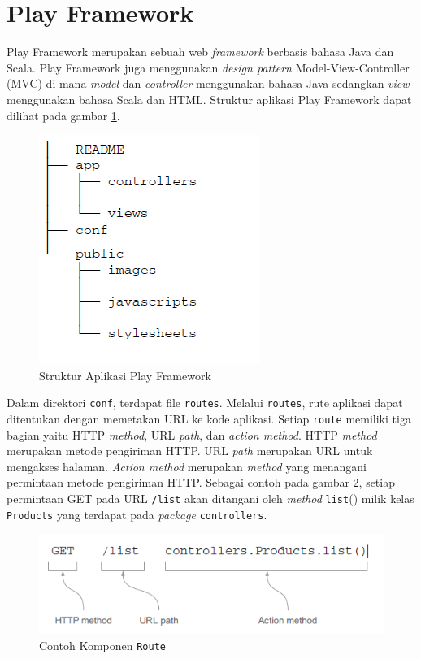 \section{Play Framework}
\label{sec:play}

Play Framework\cite{Leroux:2014} merupakan sebuah web \textit{framework} berbasis bahasa Java dan Scala. Play Framework juga menggunakan \textit{design pattern} Model-View-Controller (MVC) di mana \textit{model} dan \textit{controller} menggunakan bahasa Java sedangkan \textit{view} menggunakan bahasa Scala dan HTML. Struktur aplikasi Play Framework dapat dilihat pada gambar \ref{fig:2_play_dir}.
\begin{figure}[H]
	\centering
	\includegraphics[scale=0.5]{Gambar/play-dir}
	\caption{Struktur Aplikasi Play Framework} 
	\label{fig:2_play_dir}
\end{figure}

Dalam direktori \texttt{conf}, terdapat file \texttt{routes}. Melalui \texttt{routes}, rute aplikasi dapat ditentukan dengan memetakan URL ke kode aplikasi. Setiap \texttt{route} memiliki tiga bagian yaitu HTTP \textit{method}, URL \textit{path}, dan \textit{action method}.  HTTP \textit{method} merupakan metode pengiriman HTTP. URL \textit{path} merupakan URL untuk mengakses halaman. \textit{Action method} merupakan \textit{method} yang menangani permintaan metode pengiriman HTTP. Sebagai contoh pada gambar \ref{fig:2_routes_example}, setiap permintaan GET pada URL \texttt{/list} akan ditangani oleh \textit{method} \texttt{list}() milik kelas \texttt{Products} yang terdapat pada \textit{package} \texttt{controllers}.

\begin{figure}[H]
	\centering
	\includegraphics[scale=0.5]{Gambar/contoh-routes}
	\caption{Contoh Komponen \texttt{Route}\cite{Leroux:2014}} 
	\label{fig:2_routes_example}
\end{figure}

